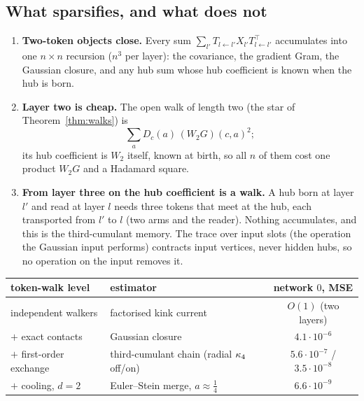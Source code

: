 \subsection{What sparsifies, and what does not}
\begin{enumerate}[leftmargin=*]
\item \textbf{Two-token objects close.} Every sum
$\sum_{l'}T_{l\leftarrow l'}X_{l'}T_{l\leftarrow l'}^{\top}$ accumulates into one $n\times n$ recursion ($n^3$ per layer): the covariance, the gradient Gram, the Gaussian closure, and any hub sum whose hub coefficient is known
when the hub is born.
\item \textbf{Layer two is cheap.} The open walk of length two (the star of Theorem~\ref{thm:walks}) is
\[\textstyle\sum_aD_c(a)\,(W_2G)(c,a)^2 ;\] its hub coefficient is $W_2$ itself, known at birth, so all $n$ of them cost one product
$W_2G$ and a Hadamard square.
\item \textbf{From layer three on the hub coefficient is a walk.} A hub born at layer $l'$ and read at layer $l$ needs
three tokens that meet at the hub, each transported from $l'$ to $l$ (two arms and the reader). Nothing accumulates, and
this is the third-cumulant memory. The trace over input slots (the operation the Gaussian input performs) contracts
input vertices, never hidden hubs, so no operation on the input removes it.
\end{enumerate}
\begin{center}\small
\begin{tabular}{llc}\toprule
token-walk level & estimator & network $0$, MSE\\\midrule
independent walkers & factorised kink current & $O(1)$ (two layers)\\
$+$ exact contacts & Gaussian closure & $4.1\cdot10^{-6}$\\
$+$ first-order exchange & third-cumulant chain (radial $\kappa_4$ off/on) & $5.6\cdot10^{-7}$ / $3.5\cdot10^{-8}$\\
$+$ cooling, $d=2$ & Euler--Stein merge, $a\approx\tfrac14$ & $6.6\cdot10^{-9}$\\\bottomrule
\end{tabular}
\end{center}
